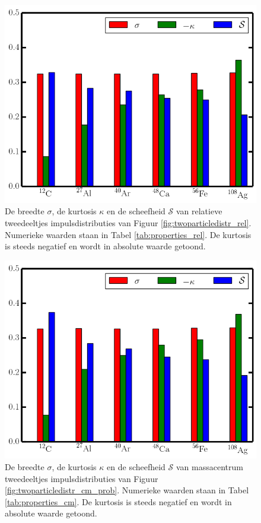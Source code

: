 \documentclass[11pt,twoside]{book}
\begin{document}
\begin{figure}
\centering
\includegraphics[scale=0.45]{./figuren/properties_rel.png}
\caption{De breedte $\sigma$, de kurtosis $\kappa$ en de scheefheid $\mathcal{S}$ van relatieve tweedeeltjes impulsdistributies van Figuur \ref{fig:twoparticledistr_rel}. Numerieke waarden staan in Tabel \ref{tab:properties_rel}. De kurtosis is steeds negatief en wordt in absolute waarde getoond.}
\label{fig:properties_rel}
\end{figure}

\begin{figure}
\centering
\includegraphics[scale=0.45]{./figuren/properties_cm.png}
\caption{De breedte $\sigma$, de kurtosis $\kappa$ en de scheefheid $\mathcal{S}$ van massacentrum tweedeeltjes impulsdistributies van Figuur \ref{fig:twoparticledistr_cm_prob}. Numerieke waarden staan in Tabel \ref{tab:properties_cm}. De kurtosis is steeds negatief en wordt in absolute waarde getoond.}
\label{fig:properties_cm}
\end{figure}
\end{document}
